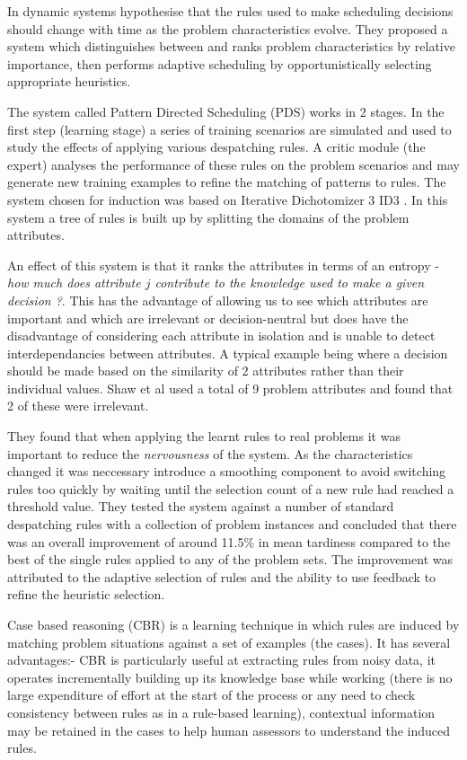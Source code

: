 In dynamic systems \citet{shaw90intelligent} hypothesise that the rules used to make scheduling decisions should change with time as the problem characteristics evolve. They proposed a system which distinguishes between and ranks problem characteristics by relative importance, then performs adaptive scheduling by opportunistically selecting appropriate heuristics. 

The system called Pattern Directed Scheduling (PDS) works in 2 stages. In the first step (learning stage) a series of training scenarios are simulated and used to study the effects of applying various despatching rules. A critic module (the expert) analyses the performance of these rules on the problem scenarios and may generate new training examples to refine the matching of patterns to rules. The system chosen for induction was based on Iterative Dichotomizer 3 ID3 \citep{quinlan86induction}. In this system a tree of rules is built up by splitting the domains of the problem attributes.%

An effect of this system is that it ranks the attributes in terms of an entropy - \emph{how much does attribute $j$ contribute to the knowledge used to make a given decision ?}. This has the advantage of allowing us to see which attributes are important and which are irrelevant or decision-neutral but does have the disadvantage of considering each attribute in isolation and is unable to detect interdependancies between attributes. A typical example being where a decision should be made based on the similarity of 2 attributes rather than their individual values. Shaw et al used a total of 9 problem attributes and found that 2 of these were irrelevant. 

They found that when applying the learnt rules to real problems it was important to reduce the \emph{nervousness} of the system. As the characteristics changed it was neccessary introduce a smoothing component to avoid switching rules too quickly by waiting until the selection count of a new rule had reached a threshold value. They tested the system against a number of standard despatching rules with a collection of problem instances and concluded that there was an overall improvement of around 11.5\% in mean tardiness compared to the best of the single rules applied to any of the problem sets. The improvement was attributed to the adaptive selection of rules and the ability to use feedback to refine the heuristic selection.


Case based reasoning (CBR) is a learning technique in which rules are induced by matching problem situations against a set of examples (the cases). It has several advantages:- CBR is particularly useful at extracting rules from noisy data, it operates incrementally building up its knowledge base while working (there is no large expenditure of effort at the start of the process or any need to check consistency between rules as in a rule-based learning), contextual information may be retained in the cases to help human assessors to understand the induced rules.

